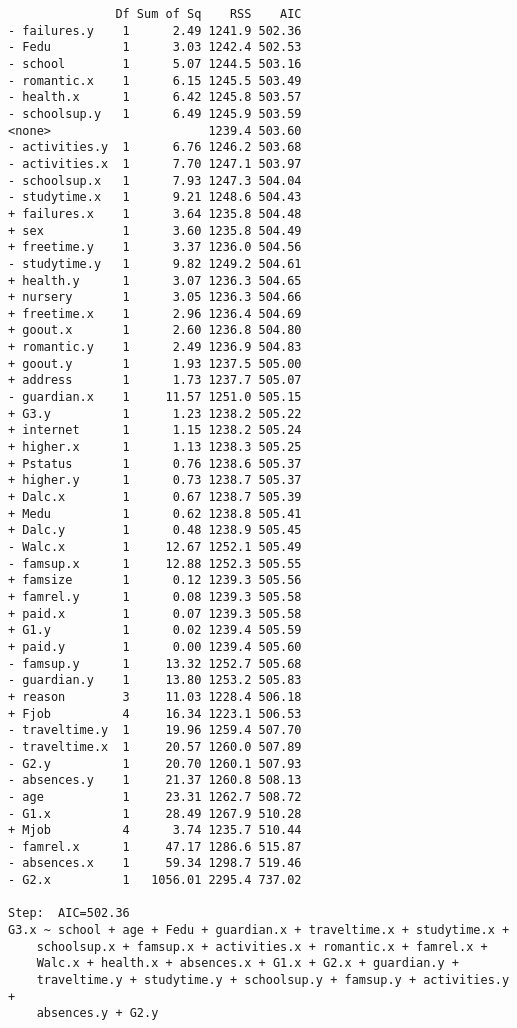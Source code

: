 \documentclass[11pt]{article}
\begin{document}
\begin{enumerate}
\begin{verbatim}
               Df Sum of Sq    RSS    AIC
- failures.y    1      2.49 1241.9 502.36
- Fedu          1      3.03 1242.4 502.53
- school        1      5.07 1244.5 503.16
- romantic.x    1      6.15 1245.5 503.49
- health.x      1      6.42 1245.8 503.57
- schoolsup.y   1      6.49 1245.9 503.59
<none>                      1239.4 503.60
- activities.y  1      6.76 1246.2 503.68
- activities.x  1      7.70 1247.1 503.97
- schoolsup.x   1      7.93 1247.3 504.04
- studytime.x   1      9.21 1248.6 504.43
+ failures.x    1      3.64 1235.8 504.48
+ sex           1      3.60 1235.8 504.49
+ freetime.y    1      3.37 1236.0 504.56
- studytime.y   1      9.82 1249.2 504.61
+ health.y      1      3.07 1236.3 504.65
+ nursery       1      3.05 1236.3 504.66
+ freetime.x    1      2.96 1236.4 504.69
+ goout.x       1      2.60 1236.8 504.80
+ romantic.y    1      2.49 1236.9 504.83
+ goout.y       1      1.93 1237.5 505.00
+ address       1      1.73 1237.7 505.07
- guardian.x    1     11.57 1251.0 505.15
+ G3.y          1      1.23 1238.2 505.22
+ internet      1      1.15 1238.2 505.24
+ higher.x      1      1.13 1238.3 505.25
+ Pstatus       1      0.76 1238.6 505.37
+ higher.y      1      0.73 1238.7 505.37
+ Dalc.x        1      0.67 1238.7 505.39
+ Medu          1      0.62 1238.8 505.41
+ Dalc.y        1      0.48 1238.9 505.45
- Walc.x        1     12.67 1252.1 505.49
- famsup.x      1     12.88 1252.3 505.55
+ famsize       1      0.12 1239.3 505.56
+ famrel.y      1      0.08 1239.3 505.58
+ paid.x        1      0.07 1239.3 505.58
+ G1.y          1      0.02 1239.4 505.59
+ paid.y        1      0.00 1239.4 505.60
- famsup.y      1     13.32 1252.7 505.68
- guardian.y    1     13.80 1253.2 505.83
+ reason        3     11.03 1228.4 506.18
+ Fjob          4     16.34 1223.1 506.53
- traveltime.y  1     19.96 1259.4 507.70
- traveltime.x  1     20.57 1260.0 507.89
- G2.y          1     20.70 1260.1 507.93
- absences.y    1     21.37 1260.8 508.13
- age           1     23.31 1262.7 508.72
- G1.x          1     28.49 1267.9 510.28
+ Mjob          4      3.74 1235.7 510.44
- famrel.x      1     47.17 1286.6 515.87
- absences.x    1     59.34 1298.7 519.46
- G2.x          1   1056.01 2295.4 737.02

Step:  AIC=502.36
G3.x ~ school + age + Fedu + guardian.x + traveltime.x + studytime.x + 
    schoolsup.x + famsup.x + activities.x + romantic.x + famrel.x + 
    Walc.x + health.x + absences.x + G1.x + G2.x + guardian.y + 
    traveltime.y + studytime.y + schoolsup.y + famsup.y + activities.y + 
    absences.y + G2.y


\end{verbatim}
\end{enumerate}
\end{document}
